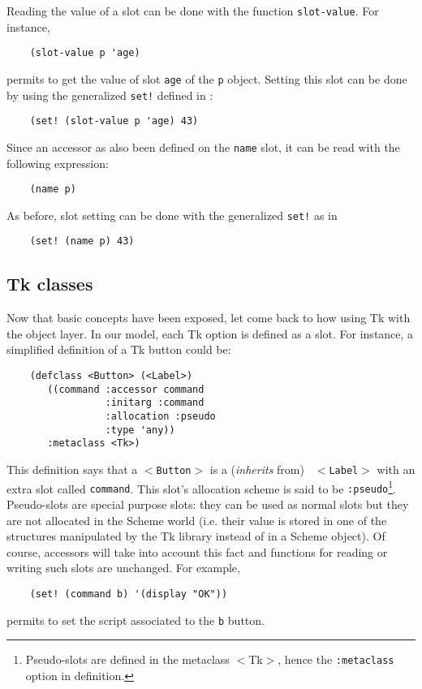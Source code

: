 Reading the value of a slot can be done with the function {\tt slot-value}.
For instance,
{\small
\begin{verbatim}
    (slot-value p 'age)
\end{verbatim}
}
\noindent
permits to get the value of slot {\tt age} of the {\tt p} object.
Setting this slot can be done by using the generalized {\tt set!} defined in \stk:
{\small
\begin{verbatim}
    (set! (slot-value p 'age) 43)
\end{verbatim}
}
\noindent
Since an accessor as also been defined on the {\tt name} slot, it can be read
with the following expression:
{\small
\begin{verbatim}
    (name p)
\end{verbatim}
}
As before, slot setting can be done with the generalized {\tt set!} as in
{\small
\begin{verbatim}
    (set! (name p) 43)
\end{verbatim}
}

\subsection{Tk classes}
Now that basic concepts have been exposed, let come back to how using Tk with
the object layer. In our model, each Tk option is defined as a slot. For
instance, a simplified definition of a Tk button could be:
{\small
\begin{verbatim}
    (defclass <Button> (<Label>)
       ((command :accessor command
                 :initarg :command
                 :allocation :pseudo
                 :type 'any))
       :metaclass <Tk>)
\end{verbatim}
}

This definition says that a {\tt $<$Button$>$} is a ({\em inherits} from) {\tt
$<$Label$>$} with an extra slot called {\tt command}. This slot's allocation
scheme is said to be {\tt :pseudo}\footnote{ Pseudo-slots are defined in the
metaclass $<$Tk$>$, hence the {\tt :metaclass} option in definition.}.
Pseudo-slots are special purpose slots: they can be used as normal slots but
they are not allocated in the Scheme world (i.e. their value is stored in
one of the structures manipulated by the Tk library instead of in a Scheme
object). Of course, accessors will take into account this fact and functions
for reading or writing such slots are unchanged. For example, 
{\small
\begin{verbatim}
    (set! (command b) '(display "OK"))
\end{verbatim}
}
\noindent
permits to set the script associated to the {\tt b} button.


